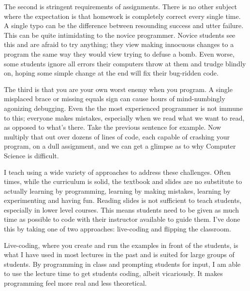 \documentclass[a4paper]{article}
\begin{document}
The second is stringent requirements of assignments.
There is no other subject where the expectation is that homework is completely correct every single time.
A single typo can be the difference between resounding success and utter failure.
This can be quite intimidating to the novice programmer.
Novice students see this and are afraid to try anything; they view making innocuous changes to a program the same way they would view trying to defuse a bomb.
Even worse, some students ignore all errors their computers throw at them and trudge blindly on, hoping some simple change at the end will fix their bug-ridden code.


The third is that you are your own worst enemy when you program.
A single misplaced brace or missing equals sign can cause hours of mind-numbingly agonizing debugging.
Even the the 
most experienced programmer is not immune to this; everyone makes mistakes, especially when we read what we want to read, as opposed to what's there.
Take the previous sentence for example.
Now multiply that out over dozens of lines of code, each capable of crashing your program, on a dull assignment, and we can get a glimpse as to why Computer Science is difficult.



I teach using a wide variety of approaches to address these challenges.
Often times, while the curriculum is solid, the textbook and slides are no substitute to actually learning by programming, learning by making mistakes, learning by experimenting and having fun.
Reading slides is not sufficient to teach students, especially in lower level courses.
This means students need to be given as much time as possible to code with their instructor available to guide them.
I've done this by taking one of two approaches: live-coding and flipping the classroom.

Live-coding, where you create and run the examples in front of the students, is what I have used in most lectures in the past and is suited for large groups of students.
By programming in class and prompting students for input, I am able to use the lecture time to get students coding, albeit vicariously.
It makes programming feel more real and less theoretical.
\end{document}
